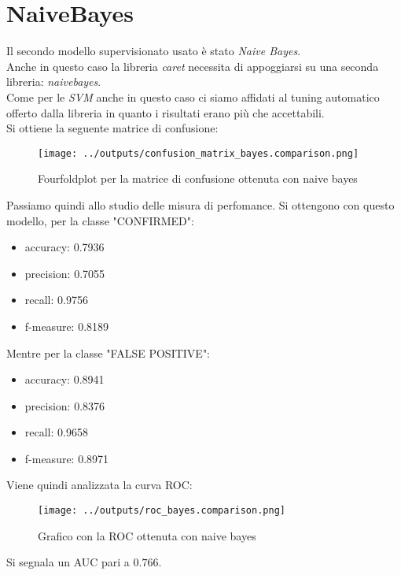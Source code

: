\section{NaiveBayes}
Il secondo modello supervisionato usato è stato \textit{Naive Bayes}.\\
Anche in questo caso la libreria \textit{caret} necessita di appoggiarsi su una 
seconda libreria: \textit{naivebayes}.\\
Come per le \textit{SVM} anche in questo caso ci siamo affidati al tuning 
automatico offerto dalla libreria in quanto i risultati erano più che 
accettabili. \\
Si ottiene la seguente matrice di confusione:
\begin{figure}[H]
    \centering
    \texttt{[image: ../outputs/confusion\_matrix\_bayes.comparison.png]}
    \caption{Fourfoldplot per la matrice di confusione ottenuta con naive bayes}
\end{figure}
Passiamo quindi allo studio delle misura di perfomance.
Si ottengono con questo modello, per la classe "CONFIRMED":
\begin{itemize}
    \item accuracy: 0.7936
    \item precision: 0.7055
    \item recall: 0.9756
    \item f-measure: 0.8189
\end{itemize}
Mentre per la classe "FALSE POSITIVE":
\begin{itemize}
    \item accuracy: 0.8941 
    \item precision: 0.8376  
    \item recall: 0.9658 
    \item f-measure: 0.8971
\end{itemize}
Viene quindi analizzata la curva ROC:
\begin{figure}[H]
    \centering
    \texttt{[image: ../outputs/roc\_bayes.comparison.png]}
    \caption{Grafico con la ROC ottenuta con naive bayes}
\end{figure}
Si segnala un AUC pari a $0.766$.

